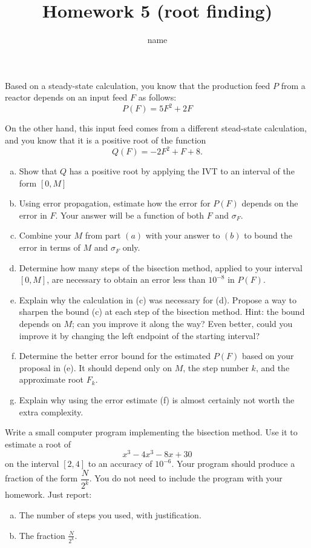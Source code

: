 \documentclass{article}
\title{\vspace{-5em}Homework 5 (root finding)}
\author{name}
\begin{document}
\maketitle


\begin{problem}
    Based on a steady-state calculation, you know that the production feed \(P\) from a reactor depends on an input feed \(F\) as follows:
    \[P(F) = 5F^2 + 2F\]

    On the other hand, this input feed comes from a different stead-state calculation, and you know that it is a positive root of the function
    \[Q(F) = -2F^2 + F + 8.\]

    \begin{enumerate}[a)]
        \item Show that \(Q\) has a positive root by applying the IVT to an interval of the form \([0,M]\)
        \item Using error propagation, estimate how the error for \(P(F)\) depends on the error in \(F\). Your answer will be a function of both \(F\) and \(\sigma_F\).
        \item Combine your \(M\) from part \((a)\) with your answer to \((b)\) to bound the error in terms of \(M\) and \(\sigma_F\) only. 
        \item Determine how many steps of the bisection method, applied to your interval \([0,M]\), are necessary to obtain an error less than \(10^{-8}\) in \(P(F)\).
        \item Explain why the calculation in (c) was necessary for (d). Propose a way to sharpen the bound (c) at each step of the bisection method. Hint: the bound depends on \(M\); can you improve it along the way? Even better, could you improve it by changing the left endpoint of the starting interval?
        \item Determine the better error bound for the estimated \(P(F)\) based on your proposal in (e). It should depend only on \(M\), the step number \(k\), and the approximate root \(F_k\).
        \item Explain why using the error estimate (f) is almost certainly not worth the extra complexity.
    \end{enumerate}
\end{problem}

\begin{problem}
    Write a small computer program implementing the bisection method. Use it to estimate a root of
    \[x^3-4x^3-8x+30\]
    on the interval \([2,4]\) to an accuracy of \(10^{-6}\). Your program should produce a fraction of the form \(\dfrac {N}{2^k}\). You do not need to include the program with your homework. Just report:
    \begin{enumerate}[a)]
        \item The number of steps you used, with justification.
        \item The fraction \(\frac{N}{2^k}\).
    \end{enumerate}
\end{problem}
\end{document}
